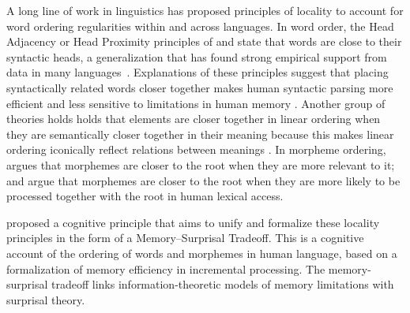 \documentclass[man]{apa7}
\newcommand{\citep}{\parencite}
\newcommand{\citet}{\Textcite}
\newcommand\mhahn[1]{{\color{red}(#1)}}
\begin{document}
A long line of work in linguistics has proposed principles of locality to account for word ordering regularities within and across languages.
In word order, the Head Adjacency or Head Proximity principles of \citet{frazier1985syntactic} and \citet{rijkhoff-word-1986} state that words are close to their syntactic heads, a generalization that has found strong empirical support from data in many languages~\citep[e.g.][]{hawkins-performance-1994,liu2008dependency, futrell-large-scale-2015, liu-dependency-2017}.
Explanations of these principles suggest that placing syntactically related words closer together makes human syntactic parsing more efficient and less sensitive to limitations in human memory \citep{frazier1985syntactic, gibson1998linguistic, hawkins-efficiency-2003, futrell2020lossy}.
Another group of theories holds holds that elements are closer together in linear ordering when they are semantically closer together in their meaning because this makes linear ordering iconically reflect relations between meanings \citep{givon1985iconicity}.
In morpheme ordering, \citet{bybee-morphology-1985} argues that morphemes are closer to the root when they are more relevant to it; \citet{hay2002speech} and \citet{plag2002the} argue that morphemes are closer to the root when they are more likely to be processed together with the root in human lexical access.




\citet{Hahn2020modeling} proposed a cognitive principle that aims to unify and formalize these locality principles in the form of a Memory--Surprisal Tradeoff.
This is a cognitive account of the ordering of words and morphemes in human language, based on a formalization of memory efficiency in incremental processing.
The memory-surprisal tradeoff links information-theoretic models of memory limitations with surprisal theory.
\end{document}
